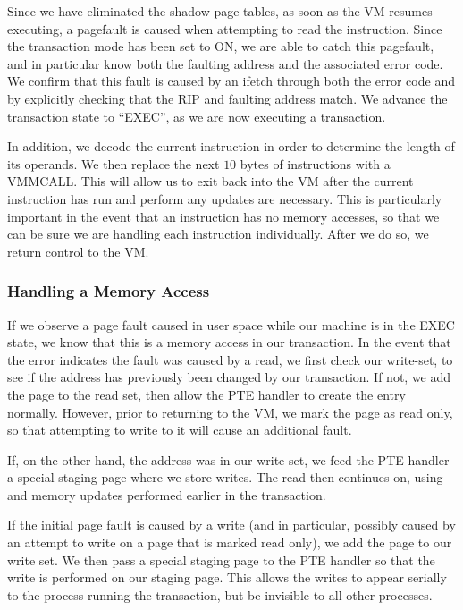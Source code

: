 \documentclass{acm_proc_article-sp}
\begin{document}
Since we have eliminated the shadow page tables, as soon as the VM resumes
executing, a pagefault is caused when attempting to read the instruction.
Since the transaction mode has been set to ON, we are able to catch this
pagefault, and in particular know both the faulting address and the associated
error code. We confirm that this fault is caused by an ifetch through both
the error code and by explicitly checking that the RIP and faulting address
match. We advance the transaction state to ``EXEC'', as we are now executing
a transaction. 
  
In addition, we decode the current instruction in order to determine the length
of its operands. We then replace the next $10$ bytes of instructions with
a VMMCALL. This will allow us to exit back into the VM after the current
instruction has run and perform any updates are necessary. This is particularly
important in the event that an instruction has no memory accesses, so that we
can be sure we are handling each instruction individually. After we do so, 
we return control to the VM.

\subsubsection{Handling a Memory Access}

If we observe a page fault caused in user space while our machine is in the
EXEC state, we know that this is a memory access in our transaction. In the 
event that the error indicates the fault was caused by a read, we first check
our write-set, to see if the address has previously been changed by our 
transaction. If not, we add the page to the read set, then allow the PTE
handler to create the entry normally. However, prior to returning to the VM,
we mark the page as read only, so that attempting to write to it will cause
an additional fault.

If, on the other hand, the address was in our write set, we feed the PTE
handler a special staging page where we store writes. The read then continues
on, using and memory updates performed earlier in the transaction.

If the initial page fault is caused by a write (and in particular, possibly 
caused by an attempt to write on a page that is marked read only), we 
add the page to our write set. We then pass a special staging page to the PTE
handler so that the write is performed on our staging page. This allows the 
writes to appear serially to the process running the transaction, but be
invisible to all other processes.
\end{document}
